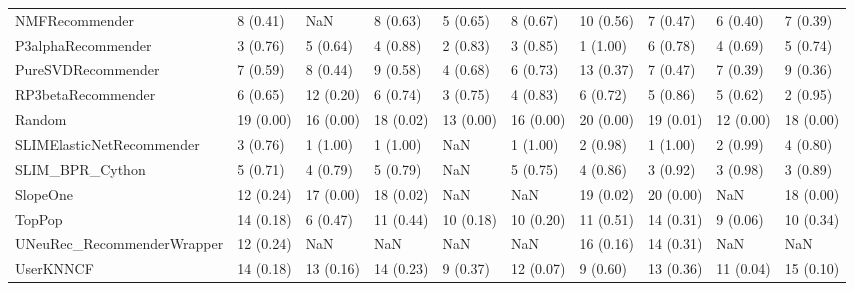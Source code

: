 \begin{tabular}{llllllllll}
                     NMFRecommender &                 8 (0.41) &         NaN &      8 (0.63) &     5 (0.65) &             8 (0.67) &           10 (0.56) &          7 (0.47) &           6 (0.40) &          7 (0.39) \\
                 P3alphaRecommender &                 3 (0.76) &    5 (0.64) &      4 (0.88) &     2 (0.83) &             3 (0.85) &            1 (1.00) &          6 (0.78) &           4 (0.69) &          5 (0.74) \\
                 PureSVDRecommender &                 7 (0.59) &    8 (0.44) &      9 (0.58) &     4 (0.68) &             6 (0.73) &           13 (0.37) &          7 (0.47) &           7 (0.39) &          9 (0.36) \\
                 RP3betaRecommender &                 6 (0.65) &   12 (0.20) &      6 (0.74) &     3 (0.75) &             4 (0.83) &            6 (0.72) &          5 (0.86) &           5 (0.62) &          2 (0.95) \\
                             Random &                19 (0.00) &   16 (0.00) &     18 (0.02) &    13 (0.00) &            16 (0.00) &           20 (0.00) &         19 (0.01) &          12 (0.00) &         18 (0.00) \\
          SLIMElasticNetRecommender &                 3 (0.76) &    1 (1.00) &      1 (1.00) &          NaN &             1 (1.00) &            2 (0.98) &          1 (1.00) &           2 (0.99) &          4 (0.80) \\
                    SLIM\_BPR\_Cython &                 5 (0.71) &    4 (0.79) &      5 (0.79) &          NaN &             5 (0.75) &            4 (0.86) &          3 (0.92) &           3 (0.98) &          3 (0.89) \\
                           SlopeOne &                12 (0.24) &   17 (0.00) &     18 (0.02) &          NaN &                  NaN &           19 (0.02) &         20 (0.00) &                NaN &         18 (0.00) \\
                             TopPop &                14 (0.18) &    6 (0.47) &     11 (0.44) &    10 (0.18) &            10 (0.20) &           11 (0.51) &         14 (0.31) &           9 (0.06) &         10 (0.34) \\
         UNeuRec\_RecommenderWrapper &                12 (0.24) &         NaN &           NaN &          NaN &                  NaN &           16 (0.16) &         14 (0.31) &                NaN &               NaN \\
                          UserKNNCF &                14 (0.18) &   13 (0.16) &     14 (0.23) &     9 (0.37) &            12 (0.07) &            9 (0.60) &         13 (0.36) &          11 (0.04) &         15 (0.10) \\
\bottomrule
\end{tabular}
